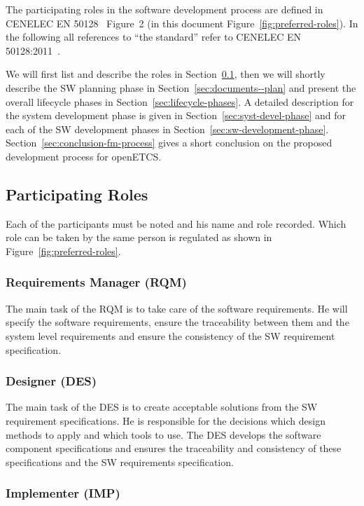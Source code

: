 
The participating roles in the software development process are defined in
CENELEC EN 50128~\cite{EN-50128} Figure~2 (in this document
Figure~\ref{fig:preferred-roles}). In the following all references to ``the
standard'' refer to CENELEC EN 50128:2011~\cite{EN-50128}.

We will first list and describe the roles in
Section~\ref{sec:participating-roles}, then we will shortly describe the SW
planning phase in Section~\ref{sec:documents--plan} and present the overall
lifecycle phases in Section~\ref{sec:lifecycle-phases}. A detailed description
for the system development phase is given in Section~\ref{sec:syst-devel-phase}
and for each of the SW development phases in
Section~\ref{sec:sw-development-phase}. Section~\ref{sec:conclusion-fm-process}
gives a short conclusion on the proposed development process for openETCS.

\subsection{Participating Roles}
\label{sec:participating-roles}

Each of the participants must be noted and his name and role recorded. Which
role can be taken by the same person is regulated as shown in
Figure~\ref{fig:preferred-roles}.

\subsubsection{Requirements Manager (RQM)}
\label{sec:requ-magang-rqm}

The main task of the RQM is to take care of the software requirements. He will
specify the software requirements, ensure the traceability between them and the
system level requirements and ensure the consistency of the SW requirement
specification.

\subsubsection{Designer (DES)}
\label{sec:designer}

The main task of the DES is to create acceptable solutions from the SW
requirement specifications. He is responsible for the decisions which design
methods to apply and which tools to use. The DES develops the software component
specifications and ensures the traceability and consistency of these
specifications and the SW requirements specification.

\subsubsection{Implementer (IMP)}
\label{sec:implementer}

